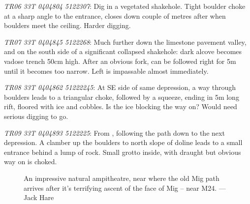 \begin{citemize}
	\item \emph{TR06 33T 0404804 5122307}: Dig in a vegetated shakehole. Tight boulder choke at a sharp angle to the entrance, closes down couple of metres after when boulders meet the ceiling. Harder digging.

	\item \emph{TR07 33T 0404845 5122268}: Much further down the limestone pavement valley, and on the south side of a significant collapsed shakehole: dark alcove becomes vadose trench 50cm high. After an obvious fork, can be followed right for 5m until it becomes too narrow. Left is impassable almost immediately.

	\item \emph{TR08 33T 0404862 51222245}:  At SE side of same depression,  a way through boulders leads to a triangular choke, followed by a squeeze, ending in 5m long rift, floored with ice and cobbles. Is the ice blocking the way on? Would need serious digging to go.

	\item \emph{TR09 33T 0404893 5122225}: From , following the path down to the next depression. A clamber up the boulders to north slope of doline leads to a small entrance behind a lump of rock. Small grotto inside, with draught but obvious way on is choked.

\end{citemize}


	\begin{figure*}[b!]
	\checkoddpage \ifoddpage \forcerectofloat \else \forceversofloat \fi
		\centering
		 \caption{An impressive natural ampitheatre, near where the old Mig path arrives after it's terrifying ascent of the face of Mig -- near M24. --- Jack Hare}
		 \label{shakehole near M24}
	\end{figure*}
